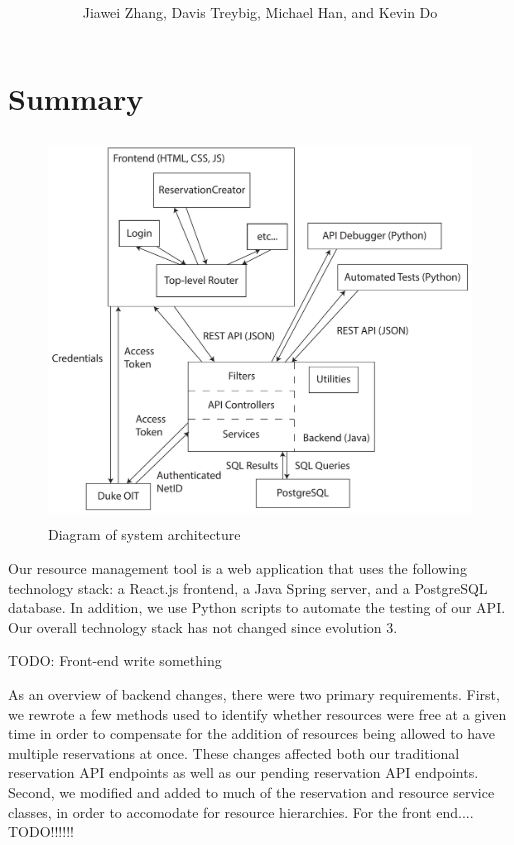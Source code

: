 \documentclass[12pt]{article}
\title{\horrule{5pt}\\\vspace{0.4cm}{\bf \mytitle}\\}
\author{Jiawei Zhang, Davis Treybig, Michael Han, and Kevin Do}
\date{\horrule{1pt}}
\begin{document}
\maketitle{}
\section{Summary}
\begin{figure}[h]
\begin{center}
\includegraphics[height=4in]{../ev2/ev2_design_cropped.pdf}
\end{center}
\caption{Diagram of system architecture}
\label{fig:design}
\end{figure}

Our resource management tool is a web application that uses the following technology stack: a React.js frontend, a Java Spring server, and a PostgreSQL database. In addition, we use Python scripts to automate the testing of our API. Our overall technology stack has not changed since evolution 3. 


TODO: Front-end write something

As an overview of backend changes, there were two primary requirements. First, we rewrote a few methods used to identify whether resources were free at a given time in order to compensate for the addition of resources being allowed to have multiple reservations at once. These changes affected both our traditional reservation API endpoints as well as our pending reservation API endpoints. Second, we modified and added to much of the reservation and resource service classes, in order to accomodate for resource hierarchies. For the front end.... TODO!!!!!!
\end{document}

